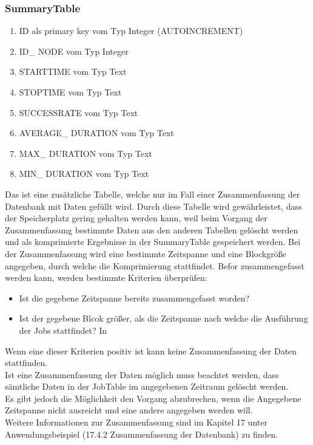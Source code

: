 \documentclass[12pt,a4paper]{report}
\begin{document}
\begin{onehalfspace}
\subsubsection{SummaryTable}
\begin{enumerate}
\item ID als primary key vom Typ Integer (AUTOINCREMENT)
\item ID\_ NODE vom Typ Integer
\item STARTTIME vom Typ Text
\item STOPTIME vom Typ Text
\item SUCCESSRATE vom Typ Text
\item AVERAGE\_ DURATION vom Typ Text
\item MAX\_ DURATION vom Typ Text
\item MIN\_ DURATION vom Typ Text
\end{enumerate}
Das ist eine zusätzliche Tabelle, welche nur im Fall einer Zusammenfassung der Datenbank mit Daten gefüllt wird.  Durch diese Tabelle wird gewährleistet, dass der Speicherplatz gering gehalten werden kann, weil beim Vorgang der Zusammenfassung bestimmte Daten aus den anderen Tabellen gelöscht werden und als komprimierte Ergebnisse in der SummaryTable gespeichert werden. Bei der Zusammenfassung wird eine bestimmte Zeitspanne und eine Blockgröße angegeben, durch welche die Komprimierung stattfindet. Befor zusammengefasst werden kann, werden bestimmte Kriterien überprüfen:
\begin{itemize}
\item Ist die gegebene Zeitspanne bereits zusammengefasst worden?
\item Ist der gegebene Blcok größer, als die Zeitspanne nach welche die Ausführung der Jobs stattfindet? In 
\end{itemize}
Wenn eine dieser Kriterien positiv ist kann keine Zusammenfassung der Daten stattfinden.
\\Ist eine Zusammenfassung der Daten möglich muss beachtet werden, dass sämtliche Daten in der JobTable im angegebenen Zeitraum gelöscht werden.\\

Es gibt jedoch die Möglichkeit den Vorgang abzubrechen, wenn die Angegebene Zeitspanne nicht ausreicht und eine andere angegeben werden will.\\

Weitere Informationen zur Zusammenfassung sind im Kapitel 17 unter Anwendungsbeispiel (17.4.2 Zusammenfassung der Datenbank) zu finden.


\end{onehalfspace}
\end{document}
